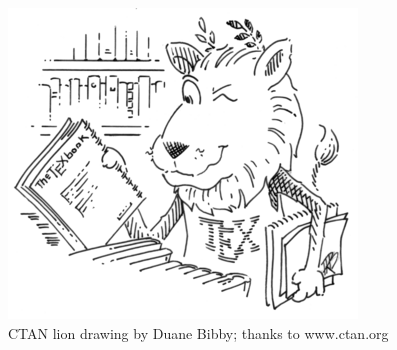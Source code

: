 \documentclass[10pt,letterpaper]{article}
\begin{document}
	\begin{figure}
		\centering
		\includegraphics[scale=0.5]{ctan_lion_350x350}
		\caption{CTAN lion drawing by Duane Bibby; thanks to www.ctan.org}
	\end{figure}	
\end{document}
